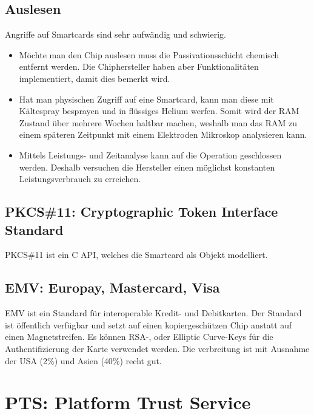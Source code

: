 \subsection{Auslesen}
Angriffe auf Smartcards sind sehr aufwändig und schwierig.
\begin{itemize}
	\item Möchte man den Chip auslesen muss die Passivationsschicht chemisch entfernt werden. Die Chiphersteller haben aber Funktionalitäten implementiert, damit dies bemerkt wird. 
	\item Hat man physischen Zugriff auf eine Smartcard, kann man diese mit Kältespray besprayen und in flüssiges Helium werfen. Somit wird der RAM Zustand über mehrere Wochen haltbar machen, weshalb man das RAM zu einem späteren Zeitpunkt mit einem Elektroden Mikroskop analysieren kann.
	\item Mittels Leistungs- und Zeitanalyse kann auf die Operation geschlossen werden. Deshalb versuchen die Hersteller einen möglichst konstanten Leistungsverbrauch zu erreichen.
\end{itemize}

\subsection{PKCS\#11: Cryptographic Token Interface Standard}
PKCS\#11 ist ein C API, welches die Smartcard als Objekt modelliert. 

\subsection{EMV: Europay, Mastercard, Visa}
EMV ist ein Standard für interoperable Kredit- und Debitkarten. Der Standard ist öffentlich verfügbar und setzt auf einen kopiergeschützen Chip anstatt auf einen Magnetstreifen. Es können RSA-, oder Elliptic Curve-Keys für die Authentifizierung der Karte verwendet werden. Die verbreitung ist mit Ausnahme der USA (2\%) und Asien (40\%) recht gut.


\section{PTS: Platform Trust Service}
